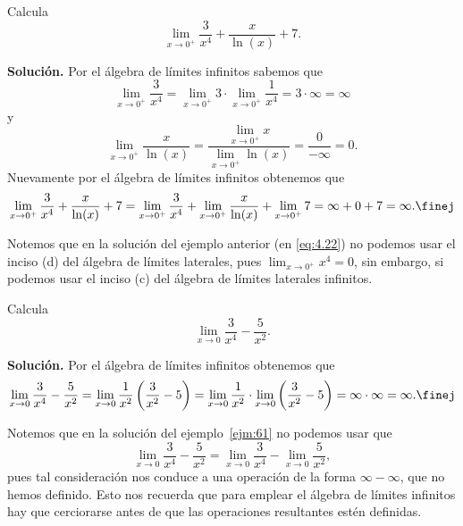 \documentclass[12pt,a4paper]{book}
\begin{document}
    \begin{ejemplo}\label{ejm:60}
        Calcula
        \begin{equation*}
            \lim_{x\to 0^{+}}\frac{3}{x^{4}}+\frac{x}{\ln(x)}+7.
        \end{equation*}

        \textbf{Solución.} Por el álgebra de límites infinitos sabemos que
        \begin{equation}\label{eq:4.22}
            \lim_{x\to 0^{+}}\frac{3}{x^{4}}=\lim_{x\to 0^{+}}3\cdot\lim_{x\to 0^{+}}\frac{1}{x^{4}}=3\cdot\infty=\infty
        \end{equation}
        y
        \begin{equation*}
            \lim_{x\to 0^{+}}\frac{x}{\ln(x)}=\frac{\lim_{x\to 0^{+}}x}{\lim_{x\to 0^{+}}\ln(x)}=\frac{0}{-\infty}=0.
        \end{equation*}
        Nuevamente por el álgebra de límites infinitos obtenemos que
        \begin{equation*}
            \lim_{x\to 0^{+}}\frac{3}{x^{4}}+\frac{x}{\ln(x)}+7=\lim_{x\to 0^{+}}\frac{3}{x^{4}}+\lim_{x\to 0^{+}}\frac{x}{\ln(x)}+\lim_{x\to 0^{+}}7=\infty+0+7=\infty.\finej
        \end{equation*}
    \end{ejemplo}

    Notemos que en la solución del ejemplo anterior (en \eqref{eq:4.22}) no podemos
    usar el inciso (d) del álgebra de límites laterales, pues $\lim_{x\to 0^{+}}x^{4}=0$, sin
    embargo, si podemos usar el inciso (c) del álgebra de límites laterales infinitos.

    \begin{ejemplo}\label{ejm:61}
        Calcula
        \begin{equation*}
            \lim_{x\to 0}\frac{3}{x^{4}}-\frac{5}{x^{2}}.
        \end{equation*}

        \textbf{Solución.} Por el álgebra de límites infinitos obtenemos que
        \begin{equation*}
            \lim_{x\to 0}\frac{3}{x^{4}}-\frac{5}{x^{2}}=\lim_{x\to 0}\frac{1}{x^{2}}\left(\frac{3}{x^{2}}-5\right)=\lim_{x\to 0}\frac{1}{x^{2}}\cdot\lim_{x\to 0}\left(\frac{3}{x^{2}}-5\right)=\infty\cdot\infty=\infty.\finej
        \end{equation*}
    \end{ejemplo}

    Notemos que en la solución del ejemplo~\ref{ejm:61} no podemos usar que
    \begin{equation*}
        \lim_{x\to 0}\frac{3}{x^{4}}-\frac{5}{x^{2}}=\lim_{x\to 0}\frac{3}{x^{4}}-\lim_{x\to 0}\frac{5}{x^{2}},
    \end{equation*}
    pues tal consideración nos conduce a una operación de la forma $\infty-\infty$, que
    no hemos definido. Esto nos recuerda que para emplear el álgebra de límites
    infinitos hay que cerciorarse antes de que las operaciones resultantes estén
    definidas.
\end{document}
